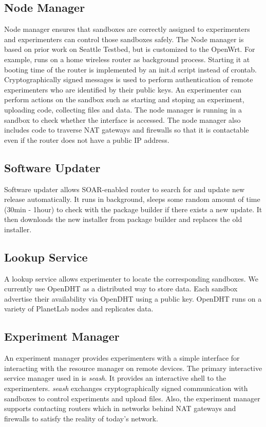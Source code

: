 \subsection{Node Manager}
\label{sec.nodemanager}
Node manager\cite{nodemanager} ensures that sandboxes are correctly assigned to experimenters and experimenters can control those sandboxes safely. The Node manager is based on prior work on Seattle Testbed, but is customized to the OpenWrt. For example, \sysname runs on a home wireless router as background process. Starting it at booting time of the router is implemented by an init.d script instead of crontab. Cryptographically signed messages is used to perform authentication of remote experimenters who are identified by their public keys. An experimenter can perform actions on the sandbox such as starting and stoping an experiment, uploading code, collecting files and data. The node manager is running in a sandbox to check whether the interface is accessed. The node manager also includes code to traverse NAT gateways and firewalls so that it is contactable even if the router does not have a public IP address. 

\subsection{Software Updater}
\label{sec.softwareupdater}
Software updater allows SOAR-enabled router to search for and update new release automatically. It runs in background, sleeps some random amount of time (30min - 1hour) to check with the package builder if there exists a new update. It then downloads the new installer from package builder and replaces the old installer. 

\subsection{Lookup Service}
\label{sec.lookupservice}
A lookup service allows experimenter to locate the corresponding sandboxes. We currently use OpenDHT\cite{rhea2005opendht} as a distributed way to store data. Each sandbox advertise their availability via OpenDHT using a public key. OpenDHT runs on a variety of PlanetLab nodes and replicates data.

\subsection{Experiment Manager}
\label{sec.seash}
An experiment manager provides experimenters with a simple interface for interacting with the resource manager on remote devices. The primary interactive service manager used in \sysname is \textit{seash}\cite{seash}. It provides an interactive shell to the experimenters. \textit{seash} exchanges cryptographically signed communication with sandboxes to control experiments and upload files. Also, the experiment manager supports contacting routers which in networks behind NAT gateways and firewalls to satisfy the reality of today's network.

